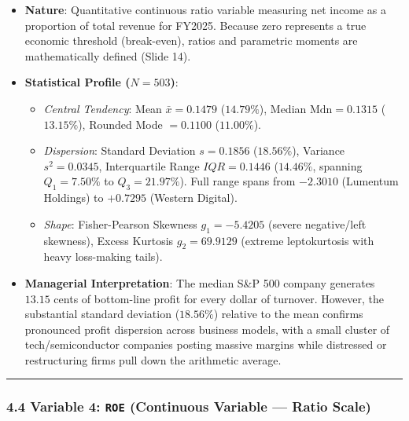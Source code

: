 \documentclass[
]{article}
\providecommand{\tightlist}{%
  \setlength{\itemsep}{0pt}\setlength{\parskip}{0pt}}
\begin{document}
\begin{itemize}
\tightlist
\item
  \textbf{Nature}: Quantitative continuous ratio variable measuring net
  income as a proportion of total revenue for FY2025. Because zero
  represents a true economic threshold (break-even), ratios and
  parametric moments are mathematically defined (Slide 14).
\item
  \textbf{Statistical Profile (\(N = 503\))}:

  \begin{itemize}
  \tightlist
  \item
    \emph{Central Tendency}: Mean \(\bar{x} = 0.1479\) (\(14.79\%\)),
    Median \(\text{Mdn} = 0.1315\) (\(13.15\%\)), Rounded Mode
    \(= 0.1100\) (\(11.00\%\)).
  \item
    \emph{Dispersion}: Standard Deviation \(s = 0.1856\) (\(18.56\%\)),
    Variance \(s^2 = 0.0345\), Interquartile Range \(IQR = 0.1446\)
    (\(14.46\%\), spanning \(Q_1 = 7.50\%\) to \(Q_3 = 21.97\%\)). Full
    range spans from \(-2.3010\) (Lumentum Holdings) to \(+0.7295\)
    (Western Digital).
  \item
    \emph{Shape}: Fisher-Pearson Skewness \(g_1 = -5.4205\) (severe
    negative/left skewness), Excess Kurtosis \(g_2 = 69.9129\) (extreme
    leptokurtosis with heavy loss-making tails).
  \end{itemize}
\item
  \textbf{Managerial Interpretation}: The median S\&P 500 company
  generates \(13.15\) cents of bottom-line profit for every dollar of
  turnover. However, the substantial standard deviation (\(18.56\%\))
  relative to the mean confirms pronounced profit dispersion across
  business models, with a small cluster of tech/semiconductor companies
  posting massive margins while distressed or restructuring firms pull
  down the arithmetic average.
\end{itemize}

\begin{center}\rule{0.5\linewidth}{0.5pt}\end{center}

\subsubsection{\texorpdfstring{4.4 Variable 4: \texttt{ROE} (Continuous
Variable --- Ratio
Scale)}{4.4 Variable 4: ROE (Continuous Variable --- Ratio Scale)}}\label{variable-4-roe-continuous-variable-ratio-scale}
\end{document}
